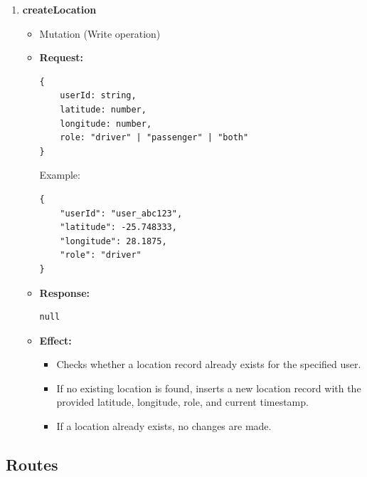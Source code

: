 \documentclass[a4paper,12pt]{article}
\begin{document}
\begin{enumerate}
    \item \textbf{createLocation}
    \begin{itemize}
        \item Mutation (Write operation)
        \item \textbf{Request:}
        \begin{verbatim}
{
    userId: string,
    latitude: number,
    longitude: number,
    role: "driver" | "passenger" | "both"
}
        \end{verbatim}
        Example:
        \begin{verbatim}
{
    "userId": "user_abc123",
    "latitude": -25.748333,
    "longitude": 28.1875,
    "role": "driver"
}
        \end{verbatim}
        \item \textbf{Response:}
        \begin{verbatim}
null
        \end{verbatim}
        \item \textbf{Effect:}
        \begin{itemize}
            \item Checks whether a location record already exists for the specified user.
            \item If no existing location is found, inserts a new location record with the provided latitude, longitude, role, and current timestamp.
            \item If a location already exists, no changes are made.
        \end{itemize}
    \end{itemize}
\end{enumerate}

\subsection*{Routes}
\end{document}
